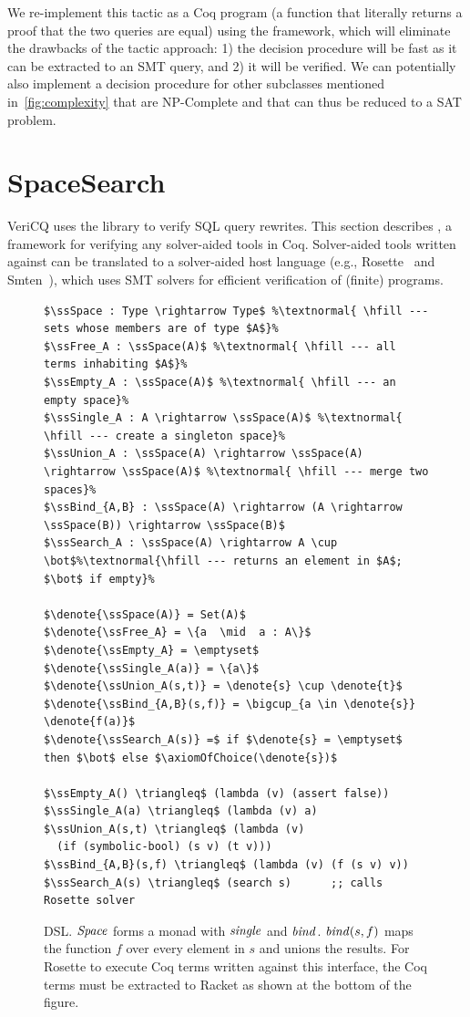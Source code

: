 We re-implement this tactic as a Coq program (a
function that literally returns a proof that the two queries are equal)
using the \SpaceSearch
framework, which will eliminate the drawbacks of the tactic approach:
1) the decision procedure will be fast as it can be extracted to an SMT query, and
2) it will be verified.
%
We can potentially also implement a decision procedure for other
subclasses mentioned in~\ref{fig:complexity} that are NP-Complete and
that can thus be reduced to a SAT problem.


\section{SpaceSearch}

VeriCQ uses the \SpaceSearch library to verify SQL query rewrites. 
This section describes \SpaceSearch, a framework for verifying any solver-aided 
tools in Coq. Solver-aided tools written against \SpaceSearch can be
translated to a solver-aided host language (e.g., Rosette~\cite{rosette-onward} and Smten~\cite{smten}), which 
uses SMT solvers for efficient verification of (finite) programs.

\begin{figure}
\begin{lstlisting}
$\ssSpace : Type \rightarrow Type$ %\textnormal{ \hfill --- sets whose members are of type $A$}%
$\ssFree_A : \ssSpace(A)$ %\textnormal{ \hfill --- all terms inhabiting $A$}%
$\ssEmpty_A : \ssSpace(A)$ %\textnormal{ \hfill --- an empty space}%
$\ssSingle_A : A \rightarrow \ssSpace(A)$ %\textnormal{ \hfill --- create a singleton space}%
$\ssUnion_A : \ssSpace(A) \rightarrow \ssSpace(A) \rightarrow \ssSpace(A)$ %\textnormal{ \hfill --- merge two spaces}%
$\ssBind_{A,B} : \ssSpace(A) \rightarrow (A \rightarrow \ssSpace(B)) \rightarrow \ssSpace(B)$
$\ssSearch_A : \ssSpace(A) \rightarrow A \cup \bot$%\textnormal{\hfill --- returns an element in $A$; $\bot$ if empty}%

$\denote{\ssSpace(A)} = Set(A)$
$\denote{\ssFree_A} = \{a  \mid  a : A\}$
$\denote{\ssEmpty_A} = \emptyset$
$\denote{\ssSingle_A(a)} = \{a\}$
$\denote{\ssUnion_A(s,t)} = \denote{s} \cup \denote{t}$
$\denote{\ssBind_{A,B}(s,f)} = \bigcup_{a \in \denote{s}} \denote{f(a)}$
$\denote{\ssSearch_A(s)} =$ if $\denote{s} = \emptyset$ then $\bot$ else $\axiomOfChoice(\denote{s})$

$\ssEmpty_A() \triangleq$ (lambda (v) (assert false))
$\ssSingle_A(a) \triangleq$ (lambda (v) a)
$\ssUnion_A(s,t) \triangleq$ (lambda (v) 
  (if (symbolic-bool) (s v) (t v)))
$\ssBind_{A,B}(s,f) \triangleq$ (lambda (v) (f (s v) v))
$\ssSearch_A(s) \triangleq$ (search s)      ;; calls Rosette solver

\end{lstlisting}
\caption{\SpaceSearch DSL\@. 
$\mathit{Space}$ forms a monad with $\mathit{single}$ and $\mathit{bind}$.
$\mathit{bind}(s,f)$ maps the function $f$ over every element in $s$ and unions the results.
For Rosette to execute Coq terms written against this interface, the Coq terms
must be extracted to Racket as shown at the bottom of the figure.}
\label{fig:rosette}
\end{figure}

